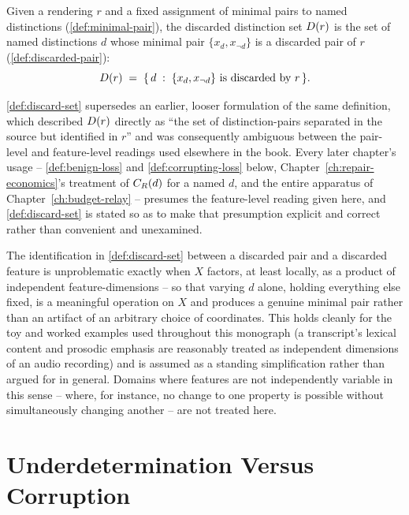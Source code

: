 \begin{definition}
\label{def:discard-set}
Given a rendering $r$ and a fixed assignment of minimal pairs to named
distinctions (\cref{def:minimal-pair}), the discarded distinction set
$D(r)$ is the set of named distinctions $d$ whose minimal pair
$\{x_d, x_{\neg d}\}$ is a discarded pair of $r$ (\cref{def:discarded-pair}):
\[
D(r) \;=\; \{\, d \;:\; \{x_d, x_{\neg d}\} \text{ is discarded by } r \,\}.
\]
\end{definition}

\cref{def:discard-set} supersedes an earlier, looser formulation of the
same definition, which described $D(r)$ directly as ``the set of
distinction-pairs separated in the source but identified in $r$'' and was
consequently ambiguous between the pair-level and feature-level readings
used elsewhere in the book. Every later chapter's usage --
\cref{def:benign-loss} and \cref{def:corrupting-loss} below,
Chapter~\ref{ch:repair-economics}'s treatment of $C_R(d)$ for a named
$d$, and the entire apparatus of Chapter~\ref{ch:budget-relay} -- presumes
the feature-level reading given here, and \cref{def:discard-set} is stated
so as to make that presumption explicit and correct rather than
convenient and unexamined.

\begin{remark}
\label{rem:bridge-clean}
The identification in \cref{def:discard-set} between a discarded pair and
a discarded feature is unproblematic exactly when $X$ factors, at least
locally, as a product of independent feature-dimensions -- so that varying
$d$ alone, holding everything else fixed, is a meaningful operation on $X$
and produces a genuine minimal pair rather than an artifact of an
arbitrary choice of coordinates. This holds cleanly for the toy and
worked examples used throughout this monograph (a transcript's lexical
content and prosodic emphasis are reasonably treated as independent
dimensions of an audio recording) and is assumed as a standing
simplification rather than argued for in general. Domains where features
are not independently variable in this sense -- where, for instance, no
change to one property is possible without simultaneously changing
another -- are not treated here.
\end{remark}

\section{Underdetermination Versus Corruption}

